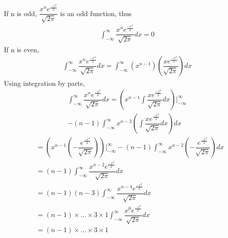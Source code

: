 \documentclass[journal,12pt,twocolumn]{IEEEtran}
\begin{document}
If n is odd, $\dfrac{x^n e^{\frac{-x^2}{2}}}{\sqrt{2\pi}}$ is an odd function, thus
\begin{align}
    \int_{-\infty}^{\infty} \dfrac{x^n e^{\frac{-x^2}{2}}}{\sqrt{2\pi}}dx = 0
\end{align}
If n is even, 
\begin{align}
    \int_{-\infty}^{\infty} \dfrac{x^n e^{\frac{-x^2}{2}}}{\sqrt{2\pi}}dx = \int_{-\infty}^{\infty} (x^{n-1}) (\dfrac{x e^{\frac{-x^2}{2}}}{\sqrt{2\pi}})dx
\end{align}
Using integration by parts,
\begin{multline}
    \int_{-\infty}^{\infty} \dfrac{x^n e^{\frac{-x^2}{2}}}{\sqrt{2\pi}}dx = \left(x^{n-1}\int \dfrac{x e^{\frac{-x^2}{2}}}{\sqrt{2\pi}}dx\right)\biggr \vert_{-\infty}^{\infty}\\
       - (n-1)\int_{-\infty}^{\infty}x^{n-2}\left(\int \dfrac{x e^{\frac{-x^2}{2}}}{\sqrt{2\pi}}dx\right) dx
\end{multline}
\begin{align}
    &= \left(x^{n-1}(-\dfrac{e^{\frac{-x^2}{2}}}{\sqrt{2\pi}})\right)\biggr \vert_{-\infty}^{\infty}
           - (n-1)\int_{-\infty}^{\infty}x^{n-2}(-\dfrac{e^{\frac{-x^2}{2}}}{\sqrt{2\pi}}) dx\\
    &= (n-1)\int_{-\infty}^{\infty} \dfrac{x^{n-2} e^{\frac{-x^2}{2}}}{\sqrt{2\pi}}dx\\
    &= (n-1)(n-3)\int_{-\infty}^{\infty} \dfrac{x^{n-4} e^{\frac{-x^2}{2}}}{\sqrt{2\pi}}dx\\
    &= (n-1)\times...\times3\times1\int_{-\infty}^{\infty} \dfrac{x^0 e^{\frac{-x^2}{2}}}{\sqrt{2\pi}}dx\\
    &= (n-1)\times...\times3\times1
\end{align}
\end{document}
